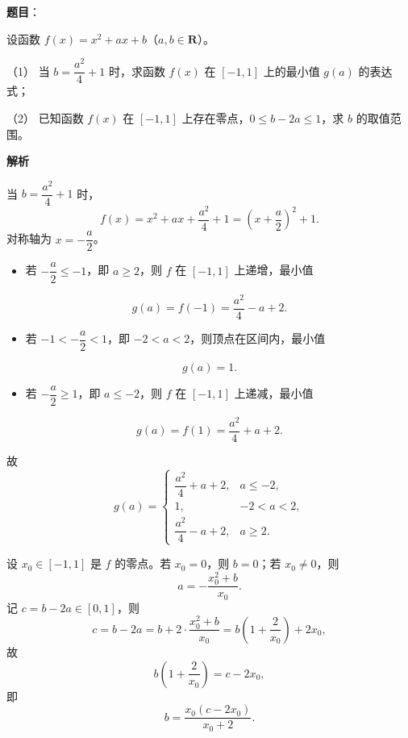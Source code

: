 \begin{answer}

\textbf{题目}：

设函数 \(f(x)=x^2+ax+b\)（\(a,b\in\mathbf{R}\)）。

（1） 当 \(b=\dfrac{a^2}{4}+1\) 时，求函数 \(f(x)\) 在 \([-1,1]\) 上的最小值 \(g(a)\) 的表达式；

（2） 已知函数 \(f(x)\) 在 \([-1,1]\) 上存在零点，\(0\leqslant b-2a\leqslant1\)，求 \(b\) 的取值范围。

\textbf{解析}


当 \(b=\dfrac{a^2}{4}+1\) 时，
\nopagebreak[4]
\[
f(x)=x^2+ax+\frac{a^2}{4}+1=\left(x+\frac{a}2\right)^2+1.
\]
对称轴为 \(x=-\dfrac{a}2\)。

\begin{itemize}
\item 若 \(-\dfrac{a}2\leqslant-1\)，即 \(a\geqslant2\)，则 \(f\) 在 \([-1,1]\) 上递增，最小值
\end{itemize}
\nopagebreak[4]
  \[
  g(a)=f(-1)=\frac{a^2}{4}-a+2.
  \]
\begin{itemize}
\item 若 \(-1<-\dfrac{a}2<1\)，即 \(-2<a<2\)，则顶点在区间内，最小值
\end{itemize}
\nopagebreak[4]
  \[
  g(a)=1.
  \]
\begin{itemize}
\item 若 \(-\dfrac{a}2\geqslant1\)，即 \(a\leqslant-2\)，则 \(f\) 在 \([-1,1]\) 上递减，最小值
\end{itemize}
\nopagebreak[4]
  \[
  g(a)=f(1)=\frac{a^2}{4}+a+2.
  \]

故
\nopagebreak[4]
\[
g(a)=\begin{cases}
\dfrac{a^2}{4}+a+2, & a\leqslant-2,\\
1, & -2<a<2,\\
\dfrac{a^2}{4}-a+2, & a\geqslant2.
\end{cases}
\]


设 \(x_0\in[-1,1]\) 是 \(f\) 的零点。若 \(x_0=0\)，则 \(b=0\)；若 \(x_0\neq0\)，则
\nopagebreak[4]
\[
a=-\frac{x_0^2+b}{x_0}.
\]
记 \(c=b-2a\in[0,1]\)，则
\nopagebreak[4]
\[
c=b-2a=b+2\cdot\frac{x_0^2+b}{x_0}
=b\left(1+\frac2{x_0}\right)+2x_0,
\]
故
\nopagebreak[4]
\[
b\left(1+\frac2{x_0}\right)=c-2x_0,
\]
即
\nopagebreak[4]
\[
b=\frac{x_0(c-2x_0)}{x_0+2}.
\]


\end{answer}
